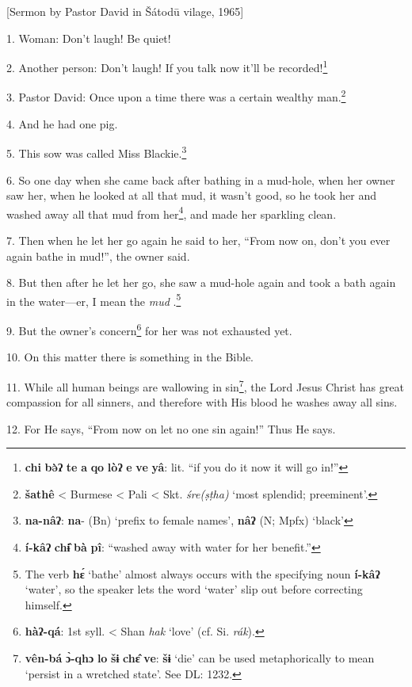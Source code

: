 \setcounter{footnote}{0}

[Sermon by Pastor David in Šátodū vilage, 1965]

1. Woman: Don't laugh! Be quiet!

2. Another person: Don't laugh! If you talk now it'll be recorded!\footnote{\textbf{chi} \textbf{bə̀ʔ} \textbf{te} \textbf{a} \textbf{qo} \textbf{lòʔ} \textbf{e} \textbf{ve} \textbf{yâ}: lit. ``if you do it now it will go in!''}

3. Pastor David: Once upon a time there was a certain wealthy man.\footnote{\textbf{šathê} < Burmese < Pali < Skt. \textit{śre(ṣṭha)} `most splendid; preeminent'.}

4. And he had one pig.

5. This sow was called Miss Blackie.\footnote{\textbf{na-nâʔ}: \textbf{na}- (Bn) `prefix to female names', \textbf{nâʔ} (N; Mpfx) `black'}

6. So one day when she came back after bathing in a mud-hole, when her owner saw
her, when he looked at all that mud, it wasn't good, so he took her and washed
away all that mud from her\footnote{\textbf{í-kâʔ} \textbf{chɨ̂} \textbf{bà} \textbf{pî}: ``washed away with water for her benefit.''}, and made her sparkling clean.

7. Then when he let her go again he said to her, ``From now on, don't you ever
again bathe in mud!'', the owner said.

8. But then after he let her go, she saw a mud-hole again and took a bath again
in the water---er, I mean the \textit{mud} .\footnote{The verb \textbf{hɛ́} `bathe' almost always occurs with the specifying noun \textbf{í-kâʔ} `water', so the speaker lets the word `water' slip out before correcting himself.}

9. But the owner's concern\footnote{\textbf{hàʔ-qá}: 1st syll. < Shan \textit{hak} `love' (cf. Si. \textit{rák}).} for her was not exhausted yet.

10. On this matter there is something in the Bible.

11. While all human beings are wallowing in sin\footnote{\textbf{vên-bá} \textbf{ɔ̀-qhɔ} \textbf{lo} \textbf{šɨ} \textbf{chɛ̂} \textbf{ve}: \textbf{šɨ} `die' can be used metaphorically to mean `persist in a wretched state'. See DL: 1232.}, the Lord Jesus Christ has
great compassion for all sinners, and therefore with His blood he washes away all sins.

12. For He says, ``From now on let no one sin again!'' Thus He says.

